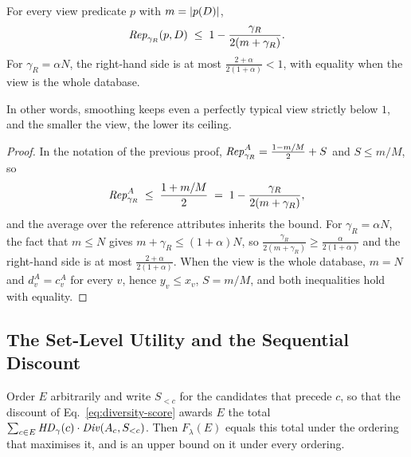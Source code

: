\begin{corollary}
\label{cor:rep-upper}
For every view predicate $p$ with $m=|p(D)|$,
\begin{equation}
\mathit{Rep}_{\gamma_R}(p,D)\;\le\;1-\frac{\gamma_R}{2(m+\gamma_R)} .
\label{eq:rep-upper}
\end{equation}
For $\gamma_R=\alpha N$, the right-hand side is at most $\frac{2+\alpha}{2(1+\alpha)}<1$, with equality when the view is the whole database.
\end{corollary}

In other words, smoothing keeps even a perfectly typical view strictly below $1$, and the smaller the view, the lower its ceiling.

\begin{proof}
In the notation of the previous proof, $\mathit{Rep}^A_{\gamma_R}=\frac{1-m/M}{2}+S$ and $S\le m/M$, so
\[
\mathit{Rep}^A_{\gamma_R}\;\le\;\frac{1+m/M}{2}\;=\;1-\frac{\gamma_R}{2(m+\gamma_R)} ,
\]
and the average over the reference attributes inherits the bound.
For $\gamma_R=\alpha N$, the fact that $m\le N$ gives $m+\gamma_R\le(1+\alpha)N$, so $\frac{\gamma_R}{2(m+\gamma_R)}\ge\frac{\alpha}{2(1+\alpha)}$ and the right-hand side is at most $\frac{2+\alpha}{2(1+\alpha)}$.
When the view is the whole database, $m=N$ and $d^A_v=c^A_v$ for every $v$, hence $y_v\le x_v$, $S=m/M$, and both inequalities hold with equality.
\end{proof}

\subsection{The Set-Level Utility and the Sequential Discount}
\label{app:proof-setobj}

\begin{proposition}
\label{prop:setobj}
Order $E$ arbitrarily and write $S_{<c}$ for the candidates that precede $c$, so that the discount of Eq.~\eqref{eq:diversity-score} awards $E$ the total $\sum_{c\in E}\mathit{HD}_\gamma(c)\cdot\mathit{Div}(A_c,S_{<c})$.
Then $F_\lambda(E)$ equals this total under the ordering that maximises it, and is an upper bound on it under every ordering.
\end{proposition}

